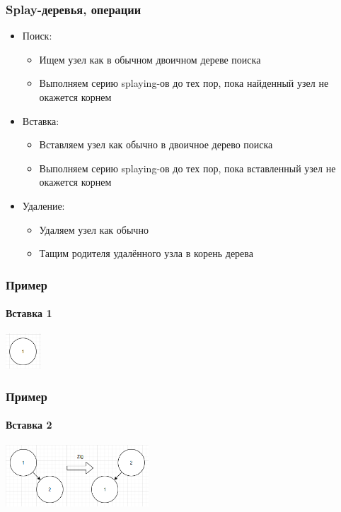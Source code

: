 \documentclass{../../slides-style}
\begin{document}
    \begin{frame}
        \frametitle{Splay-деревья, операции}
        \begin{itemize}
            \item Поиск:
            \begin{itemize}
                \item Ищем узел как в обычном двоичном дереве поиска
                \item Выполняем серию splaying-ов до тех пор, пока найденный узел не окажется корнем
            \end{itemize}
            \item Вставка:
            \begin{itemize}
                \item Вставляем узел как обычно в двоичное дерево поиска
                \item Выполняем серию splaying-ов до тех пор, пока вставленный узел не окажется корнем
            \end{itemize}
            \item Удаление:
            \begin{itemize}
                \item Удаляем узел как обычно
                \item Тащим родителя удалённого узла в корень дерева
            \end{itemize}
        \end{itemize}
    \end{frame}

    \begin{frame}
        \frametitle{Пример}
        \framesubtitle{Вставка 1}
        \begin{center}
            \includegraphics[width=0.1\textwidth]{splay1.png}
        \end{center}
    \end{frame}

    \begin{frame}
        \frametitle{Пример}
        \framesubtitle{Вставка 2}
        \begin{center}
            \includegraphics[width=0.4\textwidth]{splay2.png}
        \end{center}
    \end{frame}
\end{document}
